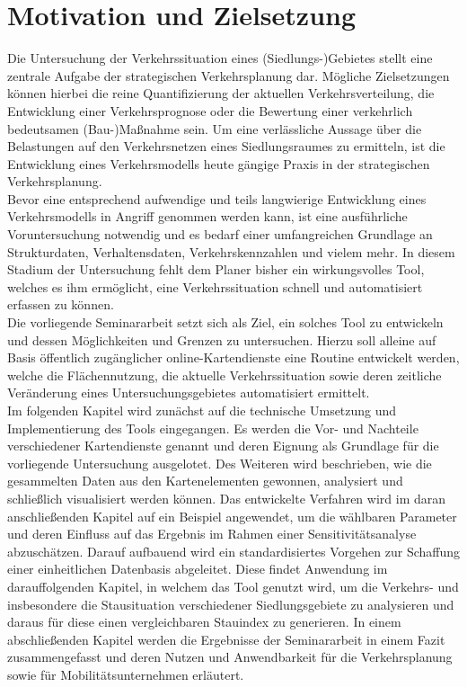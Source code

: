 \section{Motivation und Zielsetzung}

Die Untersuchung der Verkehrssituation eines (Siedlungs-)Gebietes stellt eine zentrale Aufgabe der strategischen Verkehrsplanung dar. Mögliche Zielsetzungen können hierbei die reine Quantifizierung der aktuellen Verkehrsverteilung, die Entwicklung einer Verkehrsprognose oder die Bewertung einer verkehrlich bedeutsamen (Bau-)Maßnahme sein. Um eine verlässliche Aussage über die Belastungen auf den Verkehrsnetzen eines Siedlungsraumes zu ermitteln, ist die Entwicklung eines Verkehrsmodells heute gängige Praxis in der strategischen Verkehrsplanung.\\
\newline
Bevor eine entsprechend aufwendige und teils langwierige Entwicklung eines Verkehrsmodells in Angriff genommen werden kann, ist eine ausführliche Voruntersuchung notwendig und es bedarf einer umfangreichen Grundlage an Strukturdaten, Verhaltensdaten, Verkehrskennzahlen und vielem mehr. In diesem Stadium der Untersuchung fehlt dem Planer bisher ein wirkungsvolles Tool, welches es ihm ermöglicht, eine Verkehrssituation schnell und automatisiert erfassen zu können.\\
\newline
Die vorliegende Seminararbeit setzt sich als Ziel, ein solches Tool zu entwickeln und dessen Möglichkeiten und Grenzen zu untersuchen. Hierzu soll alleine auf Basis öffentlich zugänglicher online-Kartendienste eine Routine entwickelt werden, welche die Flächennutzung, die aktuelle Verkehrssituation sowie deren zeitliche Veränderung eines Untersuchungsgebietes automatisiert ermittelt.\\
\newline
Im folgenden Kapitel wird zunächst auf die technische Umsetzung und Implementierung des Tools eingegangen. Es werden die Vor- und Nachteile verschiedener Kartendienste genannt und deren Eignung als Grundlage für die vorliegende Untersuchung ausgelotet. Des Weiteren wird beschrieben, wie die gesammelten Daten aus den Kartenelementen gewonnen, analysiert und schließlich visualisiert werden können. Das entwickelte Verfahren wird im daran anschließenden Kapitel auf ein Beispiel angewendet, um die wählbaren Parameter und deren Einfluss auf das Ergebnis im Rahmen einer Sensitivitätsanalyse abzuschätzen. Darauf aufbauend wird ein standardisiertes Vorgehen zur Schaffung einer einheitlichen Datenbasis abgeleitet. Diese findet Anwendung im darauffolgenden Kapitel, in welchem das Tool genutzt wird, um die Verkehrs- und insbesondere die Stausituation verschiedener Siedlungsgebiete zu analysieren und daraus für diese einen vergleichbaren Stauindex zu generieren. 
In einem abschließenden Kapitel werden die Ergebnisse der Seminararbeit in einem Fazit zusammengefasst und deren Nutzen und Anwendbarkeit für die Verkehrsplanung sowie für Mobilitätsunternehmen erläutert.

